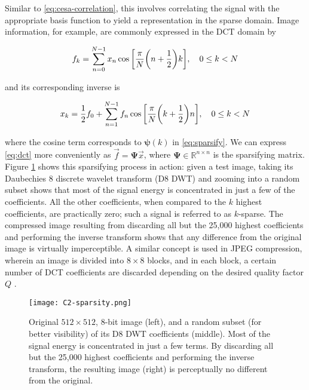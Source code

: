 Similar to \eqref{eq:cesa-correlation}, this involves correlating the signal with the appropriate basis function to yield a representation in the sparse domain. Image information, for example, are commonly expressed in the DCT domain by

\begin{equation}\label{eq:dct}
	f_k = \sum_{n=0}^{N-1} x_n \cos\qty[\frac{\pi}{N}\qty(n + \frac{1}{2})k] , \quad 0 \leq k < N
\end{equation}

\noindent and its corresponding inverse is

\begin{equation}\label{eq:idct}
	x_k = \frac{1}{2}f_0 + \sum_{n=1}^{N-1} f_n \cos\qty[\frac{\pi}{N} \qty(k + \frac{1}{2})n] , \quad 0 \leq k < N
\end{equation}

\noindent where the cosine term corresponds to $\bm\psi(k)$ in \eqref{eq:sparsify}. We can express \eqref{eq:dct} more conveniently as $\vec{f} = \bm\Psi \vec{x}$, where $\bm\Psi \in \mathbb{R}^{n \times n}$ is the sparsifying matrix. Figure \ref{fig:sparsity} shows this sparsifying process in action: given a test image, taking its Daubechies 8 discrete wavelet transform (D8 DWT) and zooming into a random subset shows that most of the signal energy is concentrated in just a few of the coefficients. All the other coefficients, when compared to the $k$ highest coefficients, are practically zero; such a signal is referred to as $k$-sparse. The compressed image resulting from discarding all but the 25,000 highest coefficients and performing the inverse transform shows that any difference from the original image is virtually imperceptible. A similar concept is used in JPEG compression, wherein an image is divided into $8 \times 8$ blocks, and in each block, a certain number of DCT coefficients are discarded depending on the desired quality factor $Q$ \cite{itu-jpeg}.

\begin{figure}[htb]
	\texttt{[image: C2-sparsity.png]}
	\caption{Original $512 \times 512$, 8-bit image (left), and a random subset (for better visibility) of its D8 DWT coefficients (middle). Most of the signal energy is concentrated in just a few terms. By discarding all but the 25,000 highest coefficients and performing the inverse transform, the resulting image (right) is perceptually no different from the original.}
	\label{fig:sparsity}
\end{figure}


